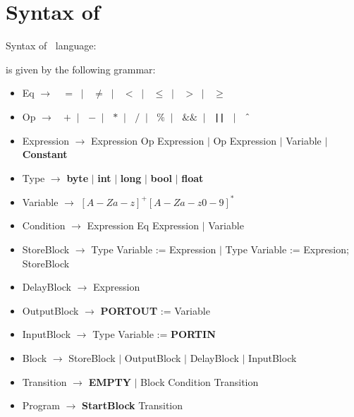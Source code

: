 \clearpage
\section{Syntax of \plcchart}
\label{sec:statechartsyn}

Syntax of \plcchart $\:$ language:
\begin{definition}
\plcchart is given by the following grammar:

\begin{itemize}
	\item Eq $\rightarrow$ $\;$ \boldmath$=$\unboldmath $\; \mid \;$ \boldmath$\neq$\unboldmath $\; \mid \;$ \boldmath$<$\unboldmath $\; \mid \;$ \boldmath$\leq$\unboldmath $\; \mid \;$ \boldmath$>$\unboldmath $\; \mid \;$ \boldmath$\geq$\unboldmath	
	\item Op $\rightarrow$ $\;$ \boldmath$+$\unboldmath $\; \mid \;$ \boldmath$-$\unboldmath $\; \mid \;$ \boldmath$*$\unboldmath $\; \mid \;$ \boldmath$/$\unboldmath $\; \mid \;$ \boldmath$\%$\unboldmath $\; \mid \;$ \boldmath$\&\&$\unboldmath $\; \mid \;$ \textbf{\texttt{||}} $\; \mid \;$ \boldmath$\mathbin{\char`\^}$\unboldmath

	\item Expression $\rightarrow$ Expression Op Expression $\mid$ Op Expression $\mid$ Variable $\mid$ \textbf{Constant}
	
	\item Type $\rightarrow$ \textbf{byte} $\mid$ \textbf{int} $\mid$ \textbf{long} $\mid$ \textbf{bool} $\mid$ \textbf{float}
	\item Variable $\rightarrow$ $[A-Za-z]^+[A-Za-z0-9]^*$

	\item Condition $\rightarrow$ Expression Eq Expression $\mid$ Variable

		
	\item StoreBlock $\rightarrow$ Type Variable := Expression $\mid$ Type Variable := Expresion; StoreBlock
	\item DelayBlock $\rightarrow$ Expression
	\item OutputBlock $\rightarrow$ \textbf{PORTOUT} := Variable
	\item InputBlock $\rightarrow$ Type Variable := \textbf{PORTIN}
	\item Block $\rightarrow$ StoreBlock $\mid$ OutputBlock $\mid$ DelayBlock $\mid$ InputBlock

	
	\item Transition $\rightarrow$ \textbf{EMPTY} $\mid$ Block Condition Transition
	
	\item Program $\rightarrow$ \textbf{StartBlock} Transition
\end{itemize}
\end{definition}

